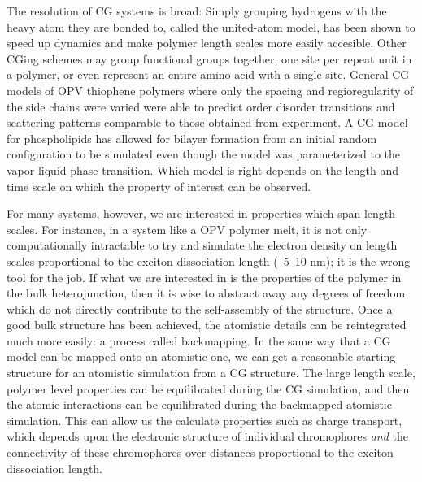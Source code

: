 The resolution of CG systems is broad:
Simply grouping hydrogens with the heavy atom they are bonded to, called the united-atom model, has been shown to speed up dynamics and make polymer length scales more easily accesible\cite{Paul1995a, Yang2006a}.
Other CGing schemes may group functional groups together\cite{Berendsen2010, Jankowski2013, Marsh2014}, one site per repeat unit in a polymer\cite{Lee2011}, or even represent an entire amino acid with a single site\cite{Peng2019}.
General CG models of OPV thiophene polymers where only the spacing and regioregularity of the side chains were varied were able to predict order disorder transitions and scattering patterns comparable to those obtained from experiment\cite{Jankowski2013, Marsh2014}.
A CG model for phospholipids has allowed for bilayer formation from an initial random configuration to be simulated even though the model was parameterized to the vapor-liquid phase transition\cite{Shelley2001}.
Which model is right depends on the length and time scale on which the property of interest can be observed.

For many systems, however, we are interested in properties which span length scales.
For instance, in a system like a OPV polymer melt, it is not only computationally intractable to try and simulate the electron density on length scales proportional to the exciton dissociation length (~5--10 nm)\cite{Huang2010}; it is the wrong tool for the job.
If what we are interested in is the properties of the polymer in the bulk heterojunction, then it is wise to abstract away any degrees of freedom which do not directly contribute to the self-assembly of the structure.
Once a good bulk structure has been achieved, the atomistic details can be reintegrated much more easily: a process called backmapping.
In the same way that a CG model can be mapped onto an atomistic one, we can get a reasonable starting structure for an atomistic simulation from a CG structure.
The large length scale, polymer level properties can be equilibrated during the CG simulation, and then the atomic interactions can be equilibrated during the backmapped atomistic simulation.
This can allow us the calculate properties such as charge transport, which depends upon the electronic structure of individual chromophores \textit{and} the connectivity of these chromophores over distances proportional to the exciton dissociation length.

